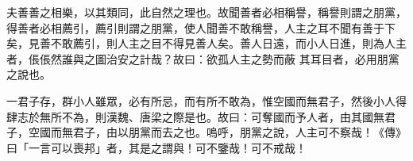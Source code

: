 \begin{pinyinscope}
 夫善善之相樂，以其類同，此自然之理也。故聞善者必相稱譽，稱譽則謂之朋黨，得善者必相薦引，薦引則謂之朋黨，使人聞善不敢稱譽，人主之耳不聞有善于下矣，見善不敢薦引，則人主之目不得見善人矣。善人日遠，而小人日進，則為人主者，倀倀然誰與之圖治安之計哉？故曰：欲孤人主之勢而蔽
 其耳目者，必用朋黨之說也。



 一君子存，群小人雖眾，必有所忌，而有所不敢為，惟空國而無君子，然後小人得肆志於無所不為，則漢魏、唐梁之際是也。故曰：可奪國而予人者，由其國無君子，空國而無君子，由以朋黨而去之也。嗚呼，朋黨之說，人主可不察哉！《傳》曰「一言可以喪邦」者，其是之謂與！可不鑒哉！可不戒哉！



\end{pinyinscope}